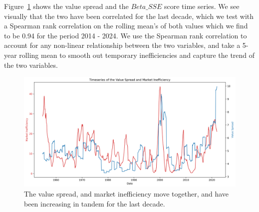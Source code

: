 Figure~\ref{value_spread_beta_sse} shows the value spread and the $Beta\_SSE$ score time series. We see visually that the two have been correlated for the last decade, which we test with a 
Spearman rank correlation on the rolling mean's of both values which we find to be 0.94 for the period 2014 - 2024. We use the Spearman rank correlation to account for any non-linear relationship between the two variables, and
 take a 5-year rolling mean to smooth out temporary inefficiencies and capture the trend of the two variables.

\begin{figure}[h!]
    \centering
    \includegraphics[width=1\textwidth]{../figs/Value_Spread_and_Market_Inefficiency.png}
    \caption{The value spread, and market inefficiency move together, and have been increasing in tandem for the last decade.}
    \label{value_spread_beta_sse}
\end{figure}